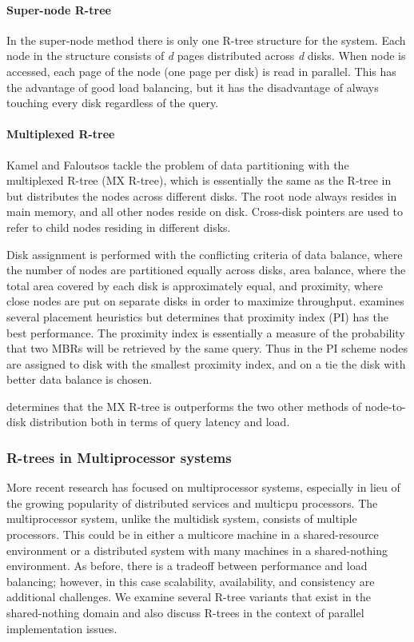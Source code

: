 \paragraph{Super-node R-tree}
In the super-node method \cite{kamel1992parallel,thebook} there is only
one R-tree structure for the system. Each node in the structure consists of
\emph{d} pages distributed across \emph{d} disks. When node is accessed, each
page of the node (one page per disk) is read in parallel. This has the 
advantage of good load balancing, but it has the disadvantage of
always touching every disk regardless of the query.

\paragraph{Multiplexed R-tree}
Kamel and Faloutsos tackle the problem of data partitioning with the 
multiplexed R-tree (MX R-tree)\cite{kamel1992parallel}, which is 
essentially the same as the R-tree 
in \cite{guttman84} but distributes the nodes across different disks. 
The root node always resides in main memory, and all other nodes reside on 
disk. Cross-disk pointers are used to refer to child nodes residing in 
different disks. 

Disk assignment is performed with the conflicting criteria of
data balance, where the number of nodes are partitioned equally across disks, 
area balance, where the total area covered by each disk is approximately 
equal, and proximity, where close nodes are put on separate disks in order to
maximize throughput. \cite{kamel1992parallel} examines several placement 
heuristics but determines that proximity index (PI) has the best performance. 
The proximity index is essentially a measure of the probability that two MBRs
will be retrieved by the same query. Thus in the PI scheme nodes are assigned 
to disk with the smallest proximity index, and on a tie the disk with better 
data balance is chosen.

\cite{kamel1992parallel} determines that the MX R-tree is outperforms the two
other methods of node-to-disk distribution both in terms of query latency and
load.
 
\subsubsection{R-trees in Multiprocessor systems}
More recent research has focused on multiprocessor systems, especially in 
lieu of the growing popularity of distributed services and multicpu processors.
The multiprocessor system, unlike the multidisk system, consists of multiple 
processors. This could be in either a multicore machine in a shared-resource
environment or a distributed system with many machines in a shared-nothing 
environment. As before, there is a tradeoff between performance and load 
balancing; however, in this case scalability, availability, and consistency
are additional challenges. We examine several R-tree variants that exist in
the shared-nothing domain and also discuss R-trees in the context of parallel 
implementation issues.

